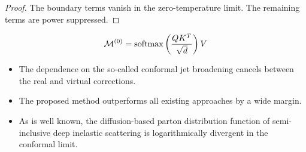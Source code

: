 \begin{proof}
The boundary terms vanish in the zero-temperature limit. The remaining
terms are power suppressed.
\end{proof}

\begin{equation}
  \mathcal{M}^{(0)} = \mathrm{softmax}\left(\frac{Q K^T}{\sqrt{d}}\right) V
  \label{eq:5}
\end{equation}

\begin{itemize}
  \item The dependence on the so-called conformal jet broadening cancels between the real and virtual corrections.
  \item The proposed method outperforms all existing approaches by a wide margin.
  \item As is well known, the diffusion-based parton distribution function of semi-inclusive deep inelastic scattering is logarithmically divergent in the conformal limit.
\end{itemize}

